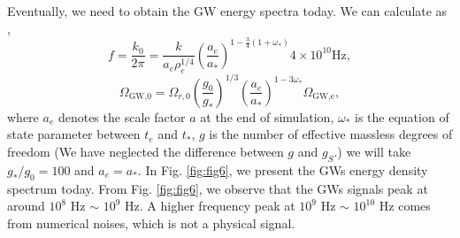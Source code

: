 \documentclass[12pt, a4paper]{article}
\begin{document}
Eventually, we need to obtain the GW energy spectra today. We can calculate as \cite{Dufaux:2007pt},
\begin{equation}
  f=\frac{k_0}{2\pi}=\frac{k}{a_e\rho_e^{1/4}}\left(\frac{a_e}{a_*}\right)^{1-\frac{3}{4}\left(1+\omega_*\right)} 4\times10^{10}\text{Hz},
\end{equation}
\begin{equation}
  \Omega_{\text{GW,0}}=\Omega_{r,0}\left(\frac{g_0}{g_*}\right)^{1/3}\left(\frac{a_e}{a_*}\right)^{1-3\omega_*}\Omega_{\text{GW,e}},
\end{equation}
where $a_e$ denotes the scale factor $a$ at the end of simulation, $\omega_*$ is the equation of state parameter between $t_e$ and $t_*$, $g$ is the number of effective massless degrees of freedom (We have neglected the difference between $g$ and $g_S$.) we will take $g_*/g_0=100$ and $a_e=a_*$.
In Fig. \ref{fig:fig6}, we present the GWs energy density spectrum today. From Fig. \ref{fig:fig6}, we observe that the GWs signals peak at around $10^8$ Hz $\sim$ $10^9$ Hz. A higher frequency peak at $10^9$ Hz $\sim$ $10^{10}$ Hz comes from numerical noises, which is not a physical signal.
\end{document}
